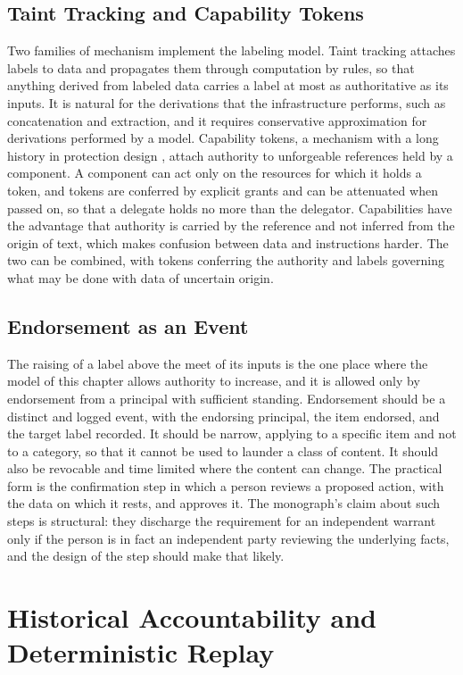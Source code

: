 \section{Taint Tracking and Capability Tokens}

Two families of mechanism implement the labeling model. Taint tracking attaches labels to data and propagates them through computation by rules, so that anything derived from labeled data carries a label at most as authoritative as its inputs. It is natural for the derivations that the infrastructure performs, such as concatenation and extraction, and it requires conservative approximation for derivations performed by a model. Capability tokens, a mechanism with a long history in protection design \cite{dennis1966}, attach authority to unforgeable references held by a component. A component can act only on the resources for which it holds a token, and tokens are conferred by explicit grants and can be attenuated when passed on, so that a delegate holds no more than the delegator. Capabilities have the advantage that authority is carried by the reference and not inferred from the origin of text, which makes confusion between data and instructions harder. The two can be combined, with tokens conferring the authority and labels governing what may be done with data of uncertain origin.

\section{Endorsement as an Event}

The raising of a label above the meet of its inputs is the one place where the model of this chapter allows authority to increase, and it is allowed only by endorsement from a principal with sufficient standing. Endorsement should be a distinct and logged event, with the endorsing principal, the item endorsed, and the target label recorded. It should be narrow, applying to a specific item and not to a category, so that it cannot be used to launder a class of content. It should also be revocable and time limited where the content can change. The practical form is the confirmation step in which a person reviews a proposed action, with the data on which it rests, and approves it. The monograph's claim about such steps is structural: they discharge the requirement for an independent warrant only if the person is in fact an independent party reviewing the underlying facts, and the design of the step should make that likely.

\chapter{Historical Accountability and Deterministic Replay}
\label{ch:replay}


